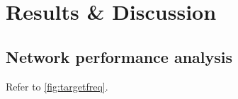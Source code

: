 \chapter{Results \& Discussion} \label{Chapter: Results}







\section{Network performance analysis}
Refer to \ref{fig:targetfreq}.

